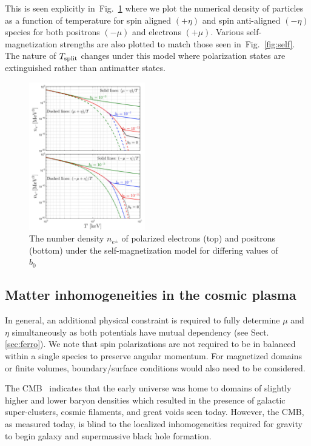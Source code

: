 \documentclass[aps,prd,floatfix,reprint]{revtex4-2}
\newcommand{\rf}[1]{Fig.~{\ref{#1}}}
\newcommand{\rsec}[1]{Sect.\,{\ref{#1}}}
\begin{document}
This is seen explicitly in~\rf{fig:polarswap} where we plot the numerical density of particles as a function of temperature for spin aligned $(+\eta)$ and spin anti-aligned $(-\eta)$ species for both positrons $(-\mu)$ and electrons $(+\mu)$. Various self-magnetization strengths are also plotted to match those seen in~\rf{fig:self}. The nature of $T_{\rm split}$ changes under this model where polarization states are extinguished rather than antimatter states.

\begin{figure}[ht]
 \centering
 \includegraphics[width=0.45\textwidth]{plots/NumeberDensitySpin.png}
 \caption{The number density $n_{e^{\pm}}$ of polarized electrons (top) and positrons (bottom) under the self-magnetization model for differing values of $b_{0}$}
 \label{fig:polarswap} 
\end{figure}

\subsection{Matter inhomogeneities in the cosmic plasma}
\label{sec:inhomogeneous}
\noindent In general, an additional physical constraint is required to fully determine $\mu$ and $\eta$ simultaneously as both potentials have mutual dependency (see \rsec{sec:ferro}). We note that spin polarizations are not required to be in balanced within a single species to preserve angular momentum. For magnetized domains or finite volumes, boundary/surface conditions would also need to be considered.

The CMB~\cite{Planck:2018vyg} indicates that the early universe was home to domains of slightly higher and lower baryon densities which resulted in the presence of galactic super-clusters, cosmic filaments, and great voids seen today. However, the CMB, as measured today, is blind to the localized inhomogeneities required for gravity to begin galaxy and supermassive black hole formation.
\end{document}
